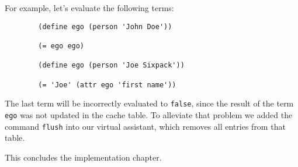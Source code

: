     For example, let's evaluate the following terms:
    \begin{verbatim}
        (define ego (person 'John Doe'))

        (= ego ego)

        (define ego (person 'Joe Sixpack'))

        (= 'Joe' (attr ego 'first name'))
    \end{verbatim}
    The last term will be incorrectly evaluated to \texttt{false}, since the result of the term \texttt{ego} was not updated in the
    cache table. To alleviate that problem we added the command \texttt{flush} into our virtual assistant, which removes all entries
    from that table.

    This concludes the implementation chapter.
